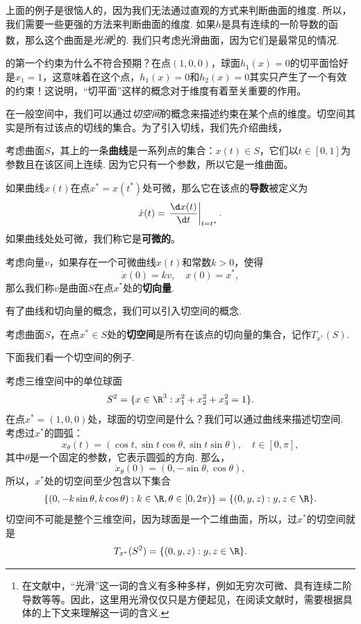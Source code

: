 上面的例子是很恼人的，因为我们无法通过直观的方式来判断曲面的维度. 所以，我们需要一些更强的方法来判断曲面的维度. 如果$h$是具有连续的一阶导数的函数，那么这个曲面是\emph{光滑}\footnote{在文献中，“光滑”这一词的含义有多种多样，例如无穷次可微、具有连续二阶导数等等。因此，这里用光滑仅仅只是方便起见，在阅读文献时，需要根据具体的上下文来理解这一词的含义.}的. 我们只考虑光滑曲面，因为它们是最常见的情况.

 的第一个约束为什么不符合预期？在点$(1,0,0)$，球面$h_1(x)=0$的切平面恰好是$x_1=1$，这意味着在这个点，$h_1(x)=0$和$h_2(x)=0$其实只产生了一个有效的约束！这说明，“切平面”这样的概念对于维度有着至关重要的作用。
    
在一般空间中，我们可以通过\emph{切空间}的概念来描述约束在某个点的维度。切空间其实是所有过该点的切线的集合。为了引入切线，我们先介绍曲线，
\begin{definition}[曲线和切向量]
    考虑曲面$S$，其上的一条\textbf{曲线}是一系列点的集合：$x(t)\in S$，它们以$t\in[0,1]$为参数且在该区间上连续. 因为它只有一个参数，所以它是一维曲面。

    如果曲线$x(t)$在点$x^*=x(t^*)$处可微，那么它在该点的\textbf{导数}被定义为
    \[\dot{x}(t)=\left.\frac{\d x(t)}{\d t}\right|_{t=t^*}.\]
    如果曲线处处可微，我们称它是\textbf{可微的}。

    考虑向量$v$，如果存在一个可微曲线$x(t)$和常数$k>0$，使得
    \[\dot{x}(0)=kv,\quad x(0)=x^*,\]
    那么我们称$v$是曲面$S$在点$x^*$处的\textbf{切向量}.
\end{definition}

有了曲线和切向量的概念，我们可以引入切空间的概念. 

\begin{definition}[切空间]
    考虑曲面$S$，在点$x^*\in S$处的\textbf{切空间}是所有在该点的切向量的集合，记作$T_{x^*}(S)$.
\end{definition}

下面我们看一个切空间的例子.

\begin{example}[三维球面的切空间]\label{ex:tan-space}
    考虑三维空间中的单位球面
    \[S^2=\{x\in\R^3:x_1^2+x_2^2+x_3^2=1\}.\]
    在点$x^*=(1,0,0)$处，球面的切空间是什么？我们可以通过曲线来描述切空间. 考虑过$x^*$的圆弧：
    \[x_\theta(t)=(\cos t,\sin t\cos\theta,\sin t\sin\theta), \quad t\in[0,\pi],\]
    其中$\theta$是一个固定的参数，它表示圆弧的方向. 那么，
    \[\dot{x}_\theta(0)=(0,-\sin\theta,\cos\theta),\]
    所以，$x^*$处的切空间至少包含以下集合
    \begin{align*}
        \{(0,-k\sin \theta,k\cos\theta):k\in\R,\theta\in[0,2\pi)\}= \{(0,y,z):y,z\in\R\}.
    \end{align*}
    切空间不可能是整个三维空间，因为球面是一个二维曲面，所以，过$x^*$的切空间就是
    \[T_{x^*}(S^2)=\{(0,y,z):y,z\in\R\}.\]
\end{example}

